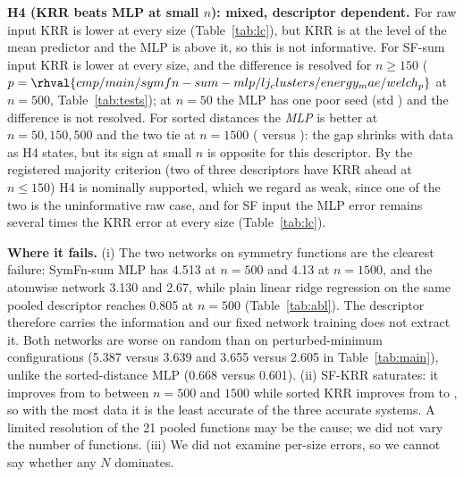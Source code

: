 \textbf{H4 (KRR beats MLP at small $n$): mixed, descriptor dependent.} For raw input KRR is lower at every size (Table~\ref{tab:lc}), but KRR is at the level of the mean predictor and the MLP is above it, so this is not informative. For SF-sum input KRR is lower at every size, and the difference is resolved for $n\ge150$ ($p=\rhval{cmp/main/symfn-sum-mlp/lj_clusters/energy_mae/welch_p}$ at $n{=}500$, Table~\ref{tab:tests}); at $n{=}50$ the MLP has one poor seed (std ) and the difference is not resolved. For sorted distances the \emph{MLP} is better at $n{=}50,150,500$ and the two tie at $n{=}1500$ ( versus ): the gap shrinks with data as H4 states, but its sign at small $n$ is opposite for this descriptor. By the registered majority criterion (two of three descriptors have KRR ahead at $n\le150$) H4 is nominally supported, which we regard as weak, since one of the two is the uninformative raw case, and for SF input the MLP error remains several times the KRR error at every size (Table~\ref{tab:lc}).

\textbf{Where it fails.} (i) The two networks on symmetry functions are the clearest failure: SymFn-sum MLP has 4.513 at $n{=}500$ and 4.13 at $n{=}1500$, and the atomwise network 3.130 and 2.67, while plain linear ridge regression on the same pooled descriptor reaches 0.805 at $n{=}500$ (Table~\ref{tab:abl}). The descriptor therefore carries the information and our fixed network training does not extract it. Both networks are worse on random than on perturbed-minimum configurations (5.387 versus 3.639 and 3.655 versus 2.605 in Table~\ref{tab:main}), unlike the sorted-distance MLP (0.668 versus 0.601). (ii) SF-KRR saturates: it improves from  to  between $n{=}500$ and $1500$ while sorted KRR improves from  to , so with the most data it is the least accurate of the three accurate systems. A limited resolution of the 21 pooled functions may be the cause; we did not vary the number of functions. (iii) We did not examine per-size errors, so we cannot say whether any $N$ dominates.
